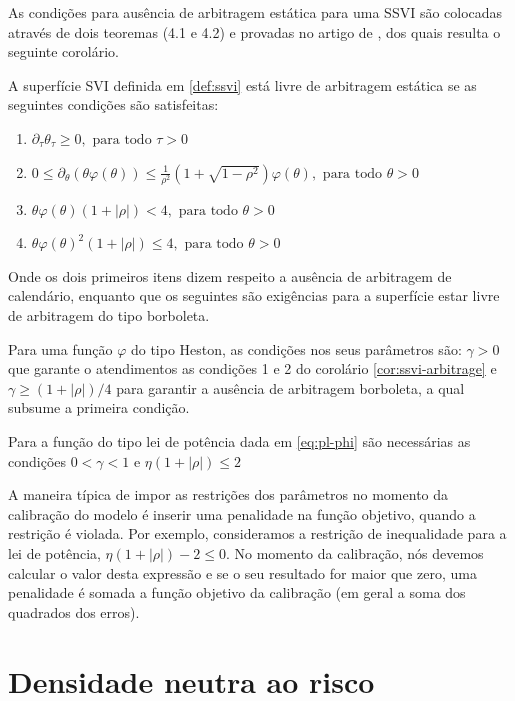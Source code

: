 \documentclass[]{book}
\providecommand{\tightlist}{%
  \setlength{\itemsep}{0pt}\setlength{\parskip}{0pt}}
\theoremstyle{definition}
\theoremstyle{definition}
\theoremstyle{definition}
\theoremstyle{remark}
\let\BeginKnitrBlock\begin \let\EndKnitrBlock\end
\begin{document}
As condições para ausência de arbitragem estática para uma SSVI são
colocadas através de dois teoremas (4.1 e 4.2) e provadas no artigo de
\citep{Gatheral2014}, dos quais resulta o seguinte corolário.

\BeginKnitrBlock{corollary}
\protect\hypertarget{cor:ssvi-arbitrage}{}{\label{cor:ssvi-arbitrage} }A
superfície SVI definida em \ref{def:ssvi} está livre de arbitragem
estática se as seguintes condições são satisfeitas:
\EndKnitrBlock{corollary}

\begin{enumerate}
\def\labelenumi{\arabic{enumi}.}
\tightlist
\item
  \(\partial_\tau\theta_\tau\geq 0, \text{ para todo } \tau > 0\)
\item
  \(0\leq \partial_\theta(\theta\varphi(\theta))\leq\frac{1}{\rho^2}\left(1+\sqrt{1-\rho^2}\right)\varphi(\theta), \text{ para todo } \theta>0\)
\item
  \(\theta\varphi(\theta)(1+|\rho|)<4, \text{ para todo } \theta>0\)
\item
  \(\theta\varphi(\theta)^2(1+|\rho|)\leq 4, \text{ para todo } \theta>0\)
\end{enumerate}

Onde os dois primeiros itens dizem respeito a ausência de arbitragem de
calendário, enquanto que os seguintes são exigências para a superfície
estar livre de arbitragem do tipo borboleta.

Para uma função \(\varphi\) do tipo Heston, as condições nos seus
parâmetros são: \(\gamma>0\) que garante o atendimentos as condições 1 e
2 do corolário \ref{cor:ssvi-arbitrage} e \(\gamma\geq(1+|\rho|)/4\)
para garantir a ausência de arbitragem borboleta, a qual subsume a
primeira condição.

Para a função do tipo lei de potência dada em \eqref{eq:pl-phi} são
necessárias as condições \(0<\gamma<1\) e \(\eta(1+|\rho|)\leq 2\)

A maneira típica de impor as restrições dos parâmetros no momento da
calibração do modelo é inserir uma penalidade na função objetivo, quando
a restrição é violada. Por exemplo, consideramos a restrição de
inequalidade para a lei de potência, \(\eta(1+|\rho|)-2\leq 0\). No
momento da calibração, nós devemos calcular o valor desta expressão e se
o seu resultado for maior que zero, uma penalidade é somada a função
objetivo da calibração (em geral a soma dos quadrados dos erros).

\section{Densidade neutra ao risco}\label{densidade-neutra-ao-risco}
\end{document}
